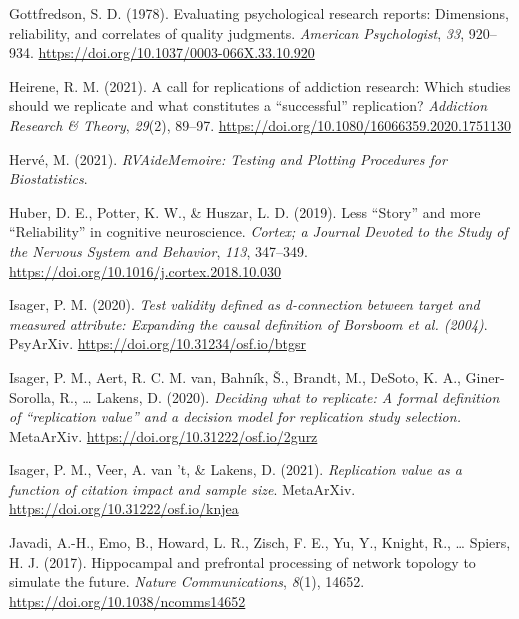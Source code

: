 \documentclass[
  man,floatsintext]{apa6}
\newlength{\cslhangindent}
\newlength{\cslentryspacingunit} %
\newenvironment{CSLReferences}[2] %
 {%
  \setlength{\parindent}{0pt}
  \ifodd #1
  \let\oldpar\par
  \def\par{\hangindent=\cslhangindent\oldpar}
  \fi
  \setlength{\parskip}{#2\cslentryspacingunit}
 }%
 {}
\begin{document}
\begin{CSLReferences}{1}{0}
\leavevmode{}%
Gottfredson, S. D. (1978). Evaluating psychological research reports: {Dimensions}, reliability, and correlates of quality judgments. \emph{American Psychologist}, \emph{33}, 920--934. \url{https://doi.org/10.1037/0003-066X.33.10.920}

\leavevmode{}%
Heirene, R. M. (2021). A call for replications of addiction research: Which studies should we replicate and what constitutes a {``successful''} replication? \emph{Addiction Research \& Theory}, \emph{29}(2), 89--97. \url{https://doi.org/10.1080/16066359.2020.1751130}

\leavevmode{}%
Hervé, M. (2021). \emph{{RVAideMemoire}: {Testing} and {Plotting Procedures} for {Biostatistics}}.

\leavevmode{}%
Huber, D. E., Potter, K. W., \& Huszar, L. D. (2019). Less {``{Story}''} and more {``{Reliability}''} in cognitive neuroscience. \emph{Cortex; a Journal Devoted to the Study of the Nervous System and Behavior}, \emph{113}, 347--349. \url{https://doi.org/10.1016/j.cortex.2018.10.030}

\leavevmode{}%
Isager, P. M. (2020). \emph{Test validity defined as d-connection between target and measured attribute: {Expanding} the causal definition of {Borsboom} et al. (2004)}. {PsyArXiv}. \url{https://doi.org/10.31234/osf.io/btgsr}

\leavevmode{}%
Isager, P. M., Aert, R. C. M. van, Bahník, Š., Brandt, M., DeSoto, K. A., Giner-Sorolla, R., \ldots{} Lakens, D. (2020). \emph{Deciding what to replicate: {A} formal definition of {``replication value''} and a decision model for replication study selection.} {MetaArXiv}. \url{https://doi.org/10.31222/osf.io/2gurz}

\leavevmode{}%
Isager, P. M., Veer, A. van 't, \& Lakens, D. (2021). \emph{Replication value as a function of citation impact and sample size}. {MetaArXiv}. \url{https://doi.org/10.31222/osf.io/knjea}

\leavevmode{}%
Javadi, A.-H., Emo, B., Howard, L. R., Zisch, F. E., Yu, Y., Knight, R., \ldots{} Spiers, H. J. (2017). Hippocampal and prefrontal processing of network topology to simulate the future. \emph{Nature Communications}, \emph{8}(1), 14652. \url{https://doi.org/10.1038/ncomms14652}


\end{CSLReferences}
\end{document}
